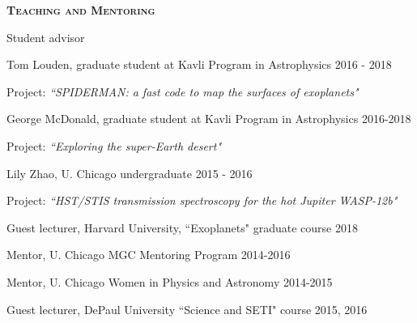 \documentclass[12pt,letterpaper]{article}
\begin{document}
\vspace{7mm}
\textbf{\textsc{Teaching and Mentoring}} 
\begin{compactitem}[]
\item Student advisor
	\begin{compactitem}
	\item Tom Louden, graduate student at Kavli Program in Astrophysics \hfill 2016 - 2018
		\begin{sloppypar}
		Project: \textit{``SPIDERMAN: a fast code to map the surfaces of exoplanets"}
		\end{sloppypar}
	\item George McDonald, graduate student at Kavli Program in Astrophysics \hfill 2016-2018
		\begin{sloppypar}
		Project: \textit{``Exploring the super-Earth desert"}
		\end{sloppypar}
	\item Lily Zhao, U. Chicago undergraduate \hfill 2015 - 2016
		\begin{sloppypar}
		Project: \textit{``HST/STIS transmission spectroscopy for the hot Jupiter WASP-12b"}
		\end{sloppypar}
	\end{compactitem}
\item Guest lecturer, Harvard University, ``Exoplanets" graduate course \hfill 2018
\item Mentor, U. Chicago MGC Mentoring Program \hfill 2014-2016 
\item Mentor, U. Chicago Women in Physics and Astronomy \hfill2014-2015
\item Guest lecturer, DePaul University ``Science and SETI" course \hfill2015, 2016

\end{compactitem}
\end{document}
